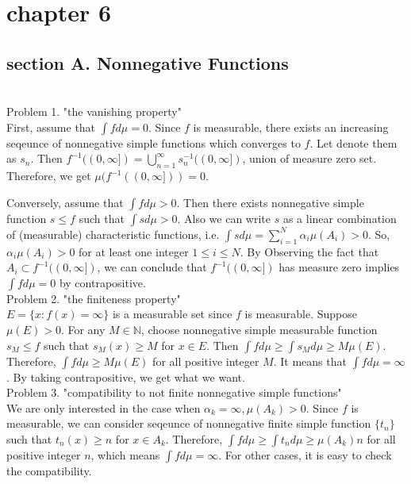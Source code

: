 \section*{chapter 6}
\subsection*{section A. Nonnegative Functions}\hfill \\

Problem 1. "the vanishing property"\\

First, assume that $\int f d\mu = 0$. Since $f$ is measurable, there exists
an increasing seqeunce of nonnegative simple functions which converges to $f$. Let
denote them as $s_n$. Then $f^{-1}((0, \infty]) = \bigcup_{n=1}^{\infty}s_n ^{-1}((0, \infty])$, union of measure zero set.
Therefore, we get $\mu(f^{-1}((0, \infty])) = 0$.

Conversely, assume that $\int f d\mu > 0$. Then there exists nonnegative
simple function $s \leq f$ such that $\int s d\mu > 0$. Also we can write $s$ as
a linear combination of (measurable) characteristic functions, i.e. $\int s d \mu = \sum_{i=1}^N \alpha_i \mu(A_i) >0$.
So, $\alpha_i \mu(A_i) > 0$ for at least one integer $1 \leq i \leq N$. By Observing the fact that $A_i \subset f^{-1}((0, \infty])$,
we can conclude that $f^{-1}((0, \infty])$ has measure zero implies $\int f d \mu = 0$ by contrapositive.\\

Problem 2. "the finiteness property"\\

$E = \{x: f(x) = \infty \}$ is a measurable set since $f$ is measurable.
Suppose $\mu(E) > 0$. For any $M \in \mathbb{N}$, choose nonnegative simple measurable function $s_M \leq f$ such that $s_M(x) \geq M$ for $x \in E$.
Then $\int f d\mu \geq \int s_M d\mu \geq M \mu(E)$. Therefore, $\int f d\mu \geq M \mu(E)$ for all positive integer $M$.
It means that $\int f d\mu = \infty$. By taking contrapositive, we get what we want.\\

Problem 3. "compatibility to not finite nonnegative simple functions" \\

We are only interested in the case when $\alpha_k = \infty, \mu(A_k) > 0$.
Since $f$ is measurable, we can consider seqeunce of nonnegative finite simple function
$\{ t_n\}$ such that $t_n(x) \geq n$ for $x \in A_k$.
Therefore, $\int f d\mu \geq \int t_n d\mu \geq \mu(A_k)n$ for all positive integer $n$, which means $\int f d\mu = \infty$.
For other cases, it is easy to check the compatibility.\\

